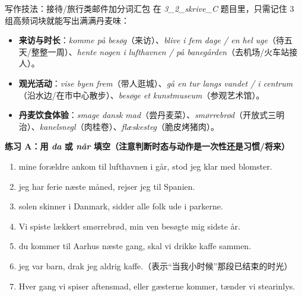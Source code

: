 \begin{grammatikbox}{写作技法：接待/旅行类邮件加分词汇包}
在 \textit{3\_2\_skrive\_C} 题目里，只需记住 3 组高频词块就能写出满满丹麦味：
\begin{itemize}
  \item \textbf{来访与时长}：\textit{komme på besøg}（来访）、\textit{blive i fem dage / en hel uge}（待五天/整整一周）、\textit{hente nogen i lufthavnen / på banegården}（去机场/火车站接人）。
  \item \textbf{观光活动}：\textit{vise byen frem}（带人逛城）、\textit{gå en tur langs vandet / i centrum}（沿水边/在市中心散步）、\textit{besøge et kunstmuseum}（参观艺术馆）。
  \item \textbf{丹麦饮食体验}：\textit{smage dansk mad}（尝丹麦菜）、\textit{smørrebrød}（开放式三明治）、\textit{kanelsnegl}（肉桂卷）、\textit{flæskesteg}（脆皮烤猪肉）。
\end{itemize}
\end{grammatikbox}


\textbf{练习 A：用 \textit{da} 或 \textit{når} 填空（注意判断时态与动作是一次性还是习惯/将来）}
\begin{enumerate}
  \item \underline{\hspace{1.8cm}} mine forældre ankom til lufthavnen i går, stod jeg klar med blomster.
  \item \underline{\hspace{1.8cm}} jeg har ferie næste måned, rejser jeg til Spanien.
  \item \underline{\hspace{1.8cm}} solen skinner i Danmark, sidder alle folk ude i parkerne.
  \item Vi spiste lækkert smørrebrød, \underline{\hspace{1.8cm}} min ven besøgte mig sidste år.
  \item \underline{\hspace{1.8cm}} du kommer til Aarhus næste gang, skal vi drikke kaffe sammen.
  \item \underline{\hspace{1.8cm}} jeg var barn, drak jeg aldrig kaffe.（表示“当我小时候”那段已结束的时光）
  \item Hver gang vi spiser aftensmad, eller \underline{\hspace{1.8cm}} gæsterne kommer, tænder vi stearinlys.
\end{enumerate}

